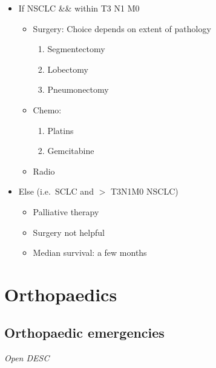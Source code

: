 \documentclass[
  12pt,
]{memoir}
\providecommand{\tightlist}{%
  \setlength{\itemsep}{0pt}\setlength{\parskip}{0pt}}
\begin{document}
\begin{itemize}
\tightlist
\item
  If NSCLC \&\& within T3 N1 M0

  \begin{itemize}
  \tightlist
  \item
    Surgery: Choice depends on extent of pathology

    \begin{enumerate}
    \def\labelenumi{\arabic{enumi}.}
    \tightlist
    \item
      Segmentectomy
    \item
      Lobectomy
    \item
      Pneumonectomy
    \end{enumerate}
  \item
    Chemo:

    \begin{enumerate}
    \def\labelenumi{\arabic{enumi}.}
    \tightlist
    \item
      Platins
    \item
      Gemcitabine
    \end{enumerate}
  \item
    Radio
  \end{itemize}
\item
  Else (i.e.~SCLC and \(>\) T3N1M0 NSCLC)

  \begin{itemize}
  \tightlist
  \item
    Palliative therapy
  \item
    Surgery not helpful
  \item
    Median survival: a few months
  \end{itemize}
\end{itemize}

\pagebreak

\hypertarget{orthopaedics}{%
\chapter{Orthopaedics}\label{orthopaedics}}

\hypertarget{orthopaedic-emergencies}{%
\section{Orthopaedic emergencies}\label{orthopaedic-emergencies}}

\emph{Open DESC}
\end{document}
